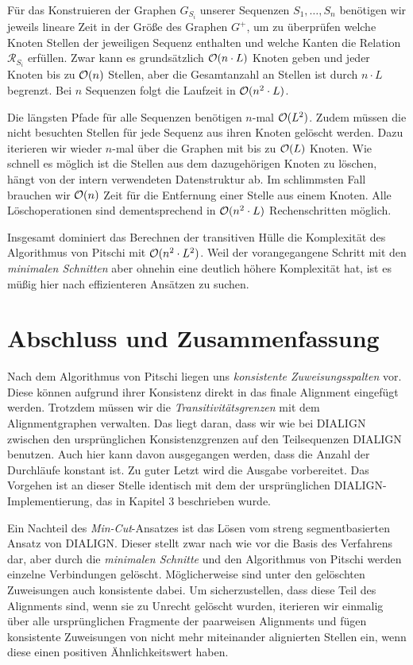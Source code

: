 Für das Konstruieren der Graphen $G_{S_i}$ unserer Sequenzen $S_1, \dots, S_n$ benötigen wir jeweils lineare Zeit in der Größe des Graphen $G^{+}$, um zu überprüfen welche Knoten Stellen der jeweiligen Sequenz enthalten und welche Kanten die Relation $\mathcal{R}_{S_i}$ erfüllen. Zwar kann es grundsätzlich $\mathcal{O}(n\cdot L)$ Knoten geben und jeder Knoten bis zu $\mathcal{O}(n)$ Stellen, aber die Gesamtanzahl an Stellen ist durch $n\cdot L$ begrenzt. Bei $n$ Sequenzen folgt die Laufzeit in $\mathcal{O}(n^2\cdot L)$.

Die längsten Pfade für alle Sequenzen benötigen $n$-mal $\mathcal{O}(L^2)$. Zudem müssen die nicht besuchten Stellen für jede Sequenz aus ihren Knoten gelöscht werden. Dazu iterieren wir wieder $n$-mal über die Graphen mit bis zu $\mathcal{O}(L)$ Knoten. Wie schnell es möglich ist die Stellen aus dem dazugehörigen Knoten zu löschen, hängt von der intern verwendeten Datenstruktur ab. Im schlimmsten Fall brauchen wir $\mathcal{O}(n)$ Zeit für die Entfernung einer Stelle aus einem Knoten. Alle Löschoperationen sind dementsprechend in $\mathcal{O}(n^2\cdot L)$ Rechenschritten möglich.

Insgesamt dominiert das Berechnen der transitiven Hülle die Komplexität des Algorithmus von Pitschi mit $\mathcal{O}(n^2\cdot L^2)$. Weil der vorangegangene Schritt mit den \emph{minimalen Schnitten} aber ohnehin eine deutlich höhere Komplexität hat, ist es müßig hier nach effizienteren Ansätzen zu suchen. 

\section{Abschluss und Zusammenfassung}

Nach dem Algorithmus von Pitschi liegen uns \emph{konsistente Zuweisungsspalten} vor. Diese können aufgrund ihrer Konsistenz direkt in das finale Alignment eingefügt werden. Trotzdem müssen wir die \emph{Transitivitätsgrenzen} mit dem Alignmentgraphen verwalten. Das liegt daran, dass wir wie bei DIALIGN zwischen den ursprünglichen Konsistenzgrenzen auf den Teilsequenzen DIALIGN benutzen. Auch hier kann davon ausgegangen werden, dass die Anzahl der Durchläufe konstant ist. Zu guter Letzt wird die Ausgabe vorbereitet. Das Vorgehen ist an dieser Stelle identisch mit dem der ursprünglichen DIALIGN-Implementierung, das in Kapitel 3 beschrieben wurde.

Ein Nachteil des \emph{Min-Cut}-Ansatzes ist das Lösen vom streng segmentbasierten Ansatz von DIALIGN. Dieser stellt zwar nach wie vor die Basis des Verfahrens dar, aber durch die \emph{minimalen Schnitte} und den Algorithmus von Pitschi werden einzelne Verbindungen gelöscht. Möglicherweise sind unter den gelöschten Zuweisungen auch konsistente dabei. Um sicherzustellen, dass diese Teil des Alignments sind, wenn sie zu Unrecht gelöscht wurden, iterieren wir einmalig über alle ursprünglichen Fragmente der paarweisen Alignments und fügen konsistente Zuweisungen von nicht mehr miteinander alignierten Stellen ein, wenn diese einen positiven Ähnlichkeitswert haben. 

